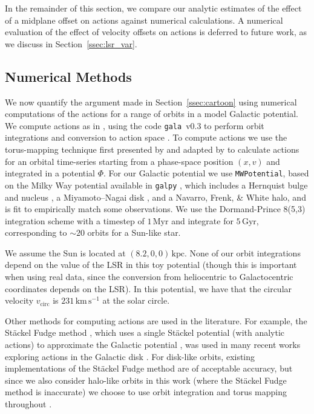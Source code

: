 \documentclass[twocolumn]{aastex62}
\newcommand{\kpc}{\text{kpc}}
\newcommand{\Myr}{\text{Myr}}
\newcommand{\Gyr}{\text{Gyr}}
\newcommand{\kms}{\text{km}\,\text{s}^{-1}}
\begin{document}
In the remainder of this section, we compare our analytic estimates of the
effect of a midplane offset on actions against numerical calculations. A
numerical evaluation of the effect of velocity offsets on actions is deferred
to future work, as we discuss in Section~\ref{ssec:lsr_var}.

\subsection{Numerical Methods} \label{ssec:action_comp}
We now quantify the argument made in Section~\ref{ssec:cartoon} using
numerical computations of the actions for a range of orbits in a model
Galactic potential. We compute actions as in \citet{2018ApJ...867...31B},
using the code \texttt{gala}~v0.3 to perform orbit integrations and conversion
to action space \citep{gala, gala:zenodo}. To compute actions we use the
torus-mapping technique first presented by \citet{1990MNRAS.244..634M} and
adapted by \citet{2014MNRAS.441.3284S} to calculate actions for an orbital
time-series starting from a phase-space position $(x, v)$ and integrated in a
potential $\Phi$. For our Galactic potential we use \texttt{MWPotential},
based on the Milky Way potential available in \texttt{galpy}
\citep{2015ApJS..216...29B}, which includes a Hernquist bulge and nucleus
\citep{1990ApJ...356..359H}, a Miyamoto--Nagai disk
\citep{1975PASJ...27..533M}, and a Navarro, Frenk, \& White
\citeyear{1997ApJ...490..493N} halo, and is fit to empirically match some
observations. We use the Dormand-Prince 8(5,3) integration scheme
\citep{Dormand80:integrator} with a timestep of $1\,\Myr$ and integrate for
$5\,\Gyr$, corresponding to $\sim 20$ orbits for a Sun-like star.

We assume the Sun is located at $(8.2, 0, 0)\,\kpc$. None of our orbit
integrations depend on the value of the LSR in this toy potential (though this
is important when using real data, since the conversion from heliocentric to
Galactocentric coordinates depends on the LSR). In this potential, we have
that the circular velocity $v_{\text{circ}}$ is $231\,\kms$ at the solar
circle.

Other methods for computing actions are used in the literature. For example,
the St\"ackel Fudge method \citep{2016MNRAS.457.2107S}, which uses a single
St\"ackel potential (with analytic actions) to approximate the Galactic
potential \citep{1985MNRAS.216..273D, 2012MNRAS.426.1324B}, was used in many
recent works exploring actions in the Galactic disk
\citep[e.g.,][]{2019MNRAS.484.3291T, 2018MNRAS.481.4093S,
2018arXiv180803278T}. For disk-like orbits, existing implementations of the
St\"ackel Fudge method are of acceptable accuracy, but since we also consider
halo-like orbits in this work (where the St\"ackel Fudge method is inaccurate)
we choose to use orbit integration and torus mapping throughout
\citep{2016MNRAS.457.2107S}.
\end{document}
